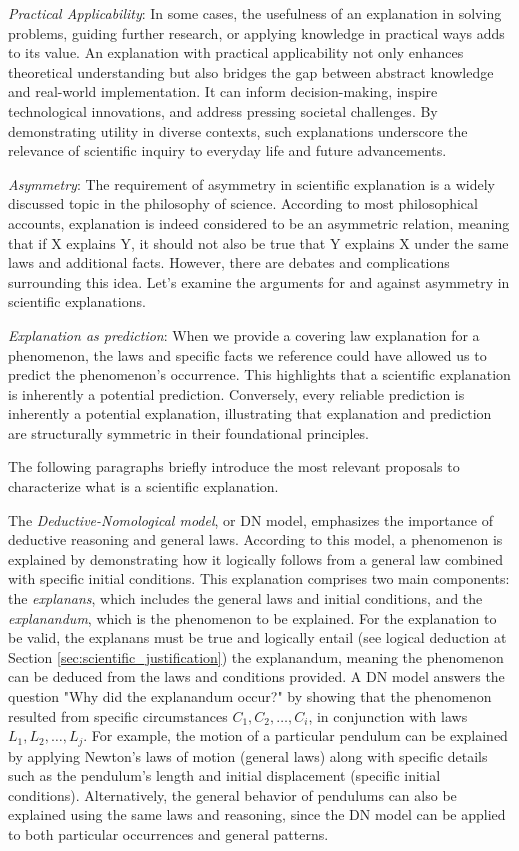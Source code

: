 \emph{Practical Applicability}: In some cases, the usefulness of an explanation in solving problems, guiding further research, or applying knowledge in practical ways adds to its value. An explanation with practical applicability not only enhances theoretical understanding but also bridges the gap between abstract knowledge and real-world implementation. It can inform decision-making, inspire technological innovations, and address pressing societal challenges. By demonstrating utility in diverse contexts, such explanations underscore the relevance of scientific inquiry to everyday life and future advancements.

\emph{Asymmetry}: The requirement of asymmetry in scientific explanation is a widely discussed topic in the philosophy of science. According to most philosophical accounts, explanation is indeed considered to be an asymmetric relation, meaning that if X explains Y, it should not also be true that Y explains  X under the same laws and additional facts. However, there are debates and complications surrounding this idea. Let’s examine the arguments for and against asymmetry in scientific explanations.

\emph{Explanation as prediction}: When we provide a covering law explanation for a phenomenon, the laws and specific facts we reference could have allowed us to predict the phenomenon's occurrence. This highlights that a scientific explanation is inherently a potential prediction. Conversely, every reliable prediction is inherently a potential explanation, illustrating that explanation and prediction are structurally symmetric in their foundational principles.

The following paragraphs briefly introduce the most relevant proposals to characterize what is a scientific explanation.

The \emph{Deductive-Nomological model}, or DN model, emphasizes the importance of deductive reasoning and general laws. According to this model, a phenomenon is explained by demonstrating how it logically follows from a general law combined with specific initial conditions. This explanation comprises two main components: the \emph{explanans}, which includes the general laws and initial conditions, and the \emph{explanandum}, which is the phenomenon to be explained. For the explanation to be valid, the explanans must be true and logically entail (see logical deduction at Section \ref{sec:scientific_justification}) the explanandum, meaning the phenomenon can be deduced from the laws and conditions provided. A DN model answers the question "Why did the explanandum occur?" by showing that the phenomenon resulted from specific circumstances $C_1, C_2, \ldots, C_i$, in conjunction with laws $L_1, L_2, \ldots, L_j$. For example, the motion of a particular pendulum can be explained by applying Newton's laws of motion (general laws) along with specific details such as the pendulum's length and initial displacement (specific initial conditions). Alternatively, the general behavior of pendulums can also be explained using the same laws and reasoning, since the DN model can be applied to both particular occurrences and general patterns.

